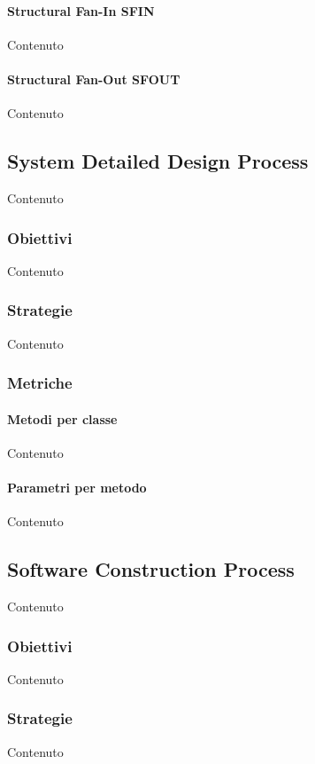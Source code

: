     \paragraph{Structural Fan-In SFIN}
    Contenuto

    \paragraph{Structural Fan-Out SFOUT}
    Contenuto


    \subsection{System Detailed Design Process}
    Contenuto

    \subsubsection{Obiettivi}
    Contenuto

    \subsubsection{Strategie}
    Contenuto


    \subsubsection{Metriche}

    \paragraph{Metodi per classe}
    Contenuto

    \paragraph{Parametri per metodo}
    Contenuto


    \subsection{Software Construction Process}
    Contenuto

    \subsubsection{Obiettivi}
    Contenuto

    \subsubsection{Strategie}
    Contenuto


